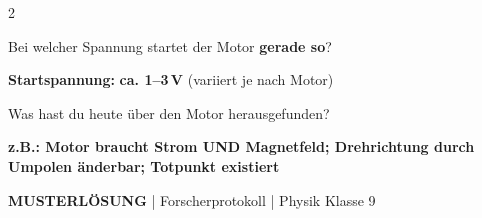 \documentclass[10pt, a4paper]{article}
\newcommand{\lsg}[1]{\textcolor{loesung}{\textbf{#1}}}
\begin{document}
\vspace{0.15cm}

\begin{multicols}{2}

\begin{bonusbox}
\small
Bei welcher Spannung startet der Motor \textbf{gerade so}?

\vspace{0.15cm}
\textbf{Startspannung:} \lsg{ca. 1--3\,V} (variiert je nach Motor)
\end{bonusbox}

\columnbreak

\begin{extrabox}[FAZIT]
\small
Was hast du heute über den Motor herausgefunden?

\vspace{0.15cm}
\lsg{z.B.: Motor braucht Strom UND Magnetfeld; Drehrichtung durch Umpolen änderbar; Totpunkt existiert}
\end{extrabox}

\end{multicols}

\vfill

\begin{center}
\small\textcolor{loesung}{\textbf{MUSTERLÖSUNG}} \textcolor{mittelgrau}{| Forscherprotokoll | Physik Klasse 9}
\end{center}
\end{document}
